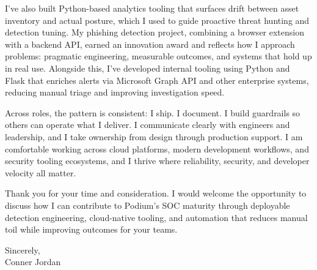 \documentclass[letterpaper,11pt]{article}
\begin{document}
\vspace{16pt}

I’ve also built Python-based analytics tooling that surfaces drift between asset inventory and actual posture, which I used to guide proactive threat hunting and detection tuning. My phishing detection project, combining a browser extension with a backend API, earned an innovation award and reflects how I approach problems: pragmatic engineering, measurable outcomes, and systems that hold up in real use. Alongside this, I’ve developed internal tooling using Python and Flask that enriches alerts via Microsoft Graph API and other enterprise systems, reducing manual triage and improving investigation speed.

\vspace{16pt}

Across roles, the pattern is consistent: I ship. I document. I build guardrails so others can operate what I deliver. I communicate clearly with engineers and leadership, and I take ownership from design through production support. I am comfortable working across cloud platforms, modern development workflows, and security tooling ecosystems, and I thrive where reliability, security, and developer velocity all matter.

\vspace{16pt}

Thank you for your time and consideration. I would welcome the opportunity to discuss how I can contribute to Podium’s SOC maturity through deployable detection engineering, cloud-native tooling, and automation that reduces manual toil while improving outcomes for your teams.

\vspace{16pt}

Sincerely,\\
Conner Jordan
\end{document}
